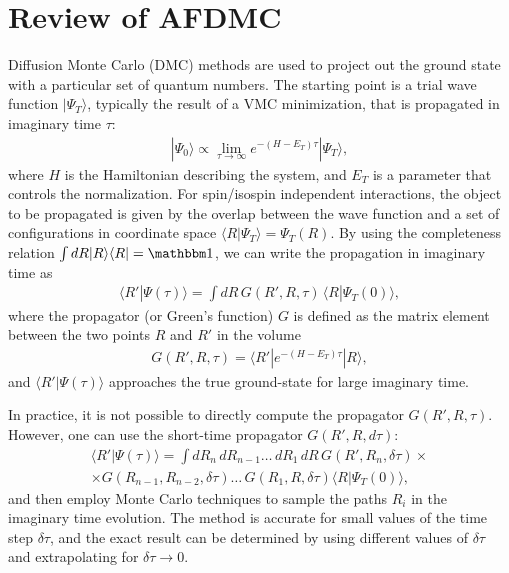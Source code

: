\documentclass[aps,prc,twocolumn,superscriptaddress,floatfix]{revtex4-1}
\begin{document}
\section{Review of AFDMC}
\label{sec:afdmc}
Diffusion Monte Carlo (DMC) methods are used to project out the ground state
with a particular set of quantum numbers. The starting point is a trial wave
function $|\Psi_T\rangle$, typically the result of a VMC minimization, that is
propagated in imaginary time $\tau$:
\begin{align}
|\Psi_0\rangle\propto \lim_{\tau\rightarrow\infty} e^{-(H-E_T)\tau}|\Psi_T\rangle ,
\end{align}
where $H$ is the Hamiltonian describing the system, and $E_T$ is a parameter that 
controls the normalization. 
For spin/isospin independent interactions, the object to be propagated 
is given by the overlap between the wave function and a set of configurations in 
coordinate space $\langle R|\Psi_T\rangle=\Psi_T(R)$. 
By using the completeness relation $\int dR |R\rangle\langle R|=\mathbbm1$,
we can write the propagation in imaginary time as
\begin{align}
\langle R'|\Psi(\tau)\rangle=\displaystyle\int dR\,G(R',R,\tau)\,\langle R|\Psi_T(0)\rangle ,
\label{eq:imtimeprop}
\end{align}
where the propagator (or Green's function) $G$ is defined as the matrix element between
the two points $R$ and $R'$ in the volume
\begin{align}
G(R',R,\tau)=\langle R'|e^{-(H-E_T)\tau}|R\rangle,
\end{align}
and $\langle R'|\Psi(\tau)\rangle$ approaches the true ground-state 
for large imaginary time.

In practice, it is not possible to directly compute
the propagator $G(R',R,\tau)$. 
However, one can use the short-time propagator $G(R',R,d\tau)$:
\begin{align}
\langle R'|\Psi(\tau)\rangle=
\int dR_n\,dR_{n-1}\ldots\,dR_1\,dR\,G(R',R_n,\delta\tau)\times\nonumber \\
\times G(R_{n-1},R_{n-2},\delta\tau)\ldots\,G(R_1,R,\delta\tau)
\langle R|\Psi_T(0)\rangle,
\end{align}
and then employ Monte Carlo techniques to sample the paths $R_i$ in the
imaginary time evolution. The method is accurate for small values of 
the time step $\delta\tau$, and the exact result 
can be determined by using different values of $\delta\tau$ 
and extrapolating for $\delta\tau\to0$.
\end{document}
